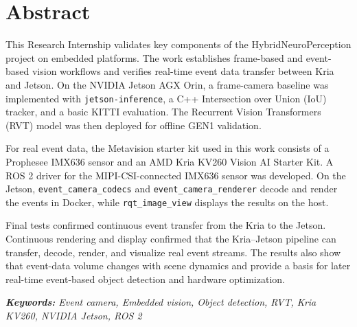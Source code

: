 \chapter*{Abstract}

This Research Internship validates key components of the HybridNeuroPerception project on embedded platforms. The work establishes frame-based and event-based vision workflows and verifies real-time event data transfer between Kria and Jetson. On the NVIDIA Jetson AGX Orin, a frame-camera baseline was implemented with \texttt{jetson-inference}, a C++ Intersection over Union (IoU) tracker, and a basic KITTI evaluation. The Recurrent Vision Transformers (RVT) model was then deployed for offline GEN1 validation.

For real event data, the Metavision starter kit used in this work consists of a Prophesee IMX636 sensor and an AMD Kria KV260 Vision AI Starter Kit. A ROS 2 driver for the MIPI-CSI-connected IMX636 sensor was developed. On the Jetson, \texttt{event\_camera\_codecs} and \texttt{event\_camera\_renderer} decode and render the events in Docker, while \texttt{rqt\_image\_view} displays the results on the host.

Final tests confirmed continuous event transfer from the Kria to the Jetson. Continuous rendering and display confirmed that the Kria--Jetson pipeline can transfer, decode, render, and visualize real event streams. The results also show that event-data volume changes with scene dynamics and provide a basis for later real-time event-based object detection and hardware optimization.

\textit{\textbf{Keywords: }Event camera, Embedded vision, Object detection, RVT, Kria KV260, NVIDIA Jetson, ROS 2}
